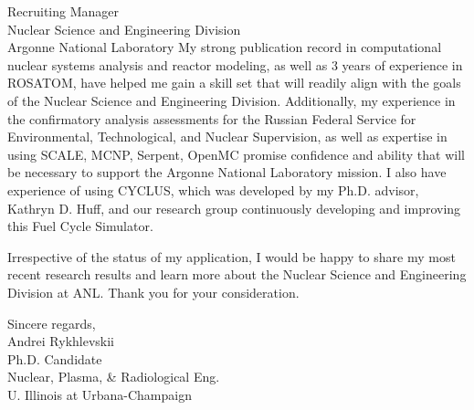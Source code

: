 \documentclass[11pt]{letter} %
\newcommand{\RecipientName}{Recruiting Manager\xspace}
\newcommand{\RecipientAddress}{Nuclear Science and Engineering Division \\
Argonne National Laboratory}
\begin{document}
\begin{letter}{\RecipientName\\
        \RecipientAddress\xspace}
My strong publication record in computational nuclear systems analysis and 
reactor modeling, as well as 3 years of experience in ROSATOM, have helped me 
gain a skill set that will readily align with the goals of the Nuclear Science 
and Engineering Division. Additionally, my experience in the confirmatory 
analysis assessments for the Russian Federal Service for Environmental, 
Technological, and Nuclear Supervision, as well as expertise in using SCALE, 
MCNP, Serpent, OpenMC promise confidence and ability that will be necessary to 
support the Argonne National Laboratory mission. I also have experience of 
using CYCLUS, which was developed by my Ph.D. advisor, Kathryn D. Huff, and 
our research group continuously developing and improving this Fuel Cycle 
Simulator.

Irrespective of the status of my application, I would be happy to share my 
most recent research results and learn more about the Nuclear Science and 
Engineering Division at ANL. Thank you for your consideration.

\closing{Sincere regards,\\
{Andrei Rykhlevskii\\
Ph.D. Candidate\\
Nuclear, Plasma, \& Radiological Eng.\\
U. Illinois at Urbana-Champaign}
}


\end{letter}
\end{document}
